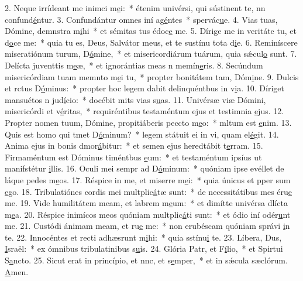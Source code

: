 2. Neque irrídeant me inimci m\uline{e}i:~* étenim univérsi, qui sústinent te, nn confund\uline{é}ntur.
3. Confundántur omnes iní ag\uline{é}ntes~* spervác\uline{u}e.
4. Vias tuas, Dómine, demnstra m\uline{i}hi~* et sémitas tus édoc\uline{e} me.
5. Dírige me in veritáte tu, et d\uline{o}ce me:~* quia tu es, Deus, Salvátor meus, et te sustínu tota d\uline{i}e.
6. Reminíscere miseratiónum turum, D\uline{ó}mine,~* et misericordiárum tuárum, quia  sǽcul\uline{o} sunt.
7. Delícta juventtis m\uline{e}æ,~* et ignorántias meas n memín\uline{e}ris.
8. Secúndum misericórdiam tuam memnto m\uline{e}i tu,~* propter bonitátem tam, Dóm\uline{i}ne.
9. Dulcis et rctus D\uline{ó}minus:~* propter hoc legem dabit delinquéntbus in v\uline{i}a.
10. Díriget mansuétos n jud\uline{í}cio:~* docébit mits vias s\uline{u}as.
11. Univérsæ viæ Dómini, misericórdi et v\uline{é}ritas,~* requiréntibus testaméntum ejus et testimnia \uline{e}jus.
12. Propter nomen tuum, Dómine, propitiáberis peccto m\uline{e}o:~* mltum est \uline{e}nim.
13. Quis est homo qui tmet D\uline{ó}minum?~* legem státuit ei in vi, quam el\uline{é}git.
14. Anima ejus in bonis dmor\uline{á}bitur:~* et semen ejus heredtábit t\uline{e}rram.
15. Firmaméntum est Dóminus timéntbus \uline{e}um:~* et testaméntum ipsíus ut manifstétur \uline{i}llis.
16. Oculi mei sempr ad D\uline{ó}minum:~* quóniam ipse evéllet de láque pedes m\uline{e}os.
17. Réspice in me, et miserre m\uline{e}i:~* quia únicus et pper sum \uline{e}go.
18. Tribulatiónes cordis mei multplic\uline{á}tæ sunt:~* de necessitátibus mes éru\uline{e} me.
19. Vide humilitátem meam, et labrem m\uline{e}um:~* et dimítte univérsa dlícta m\uline{e}a.
20. Réspice inimícos meos quóniam multplic\uline{á}ti sunt:~* et ódio iní odér\uline{u}nt me.
21. Custódi ánimam meam, et ru\uline{e} me:~* non erubéscam quóniam správi \uline{i}n te.
22. Innocéntes et recti adhæsrunt m\uline{i}hi:~* quia sstínu\uline{i} te.
23. Líbera, Dus, \uline{I}sraël:~* ex ómnibus tribulatinibus s\uline{u}is.
24. Glória Patr, et F\uline{í}lio,~* et Spirtui S\uline{a}ncto.
25. Sicut erat in princípio, et nnc, et s\uline{e}mper,~* et in sǽcula sæclórum. \uline{A}men.
